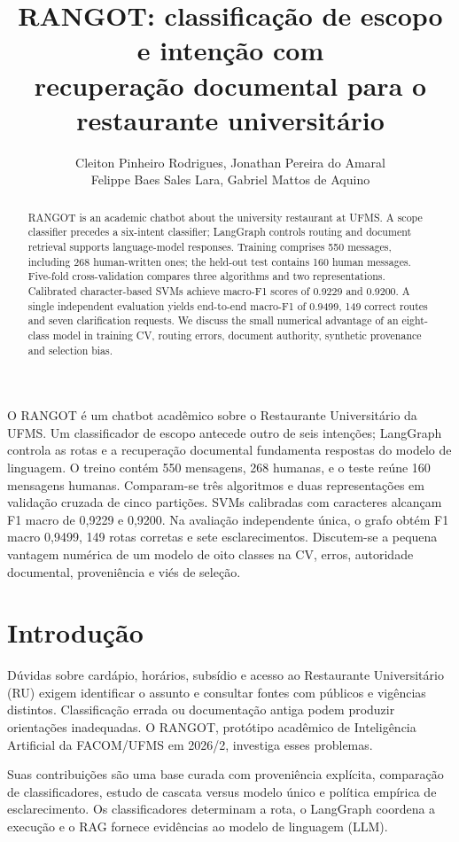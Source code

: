 \documentclass[12pt]{article}
\title{RANGOT: classificação de escopo e intenção com\\recuperação documental para o restaurante universitário}
\author{Cleiton Pinheiro Rodrigues\inst{1}, Jonathan Pereira do Amaral\inst{1}\\
Felippe Baes Sales Lara\inst{1}, Gabriel Mattos de Aquino\inst{1}}
\begin{document}
\maketitle
\begin{abstract}
RANGOT is an academic chatbot about the university restaurant at UFMS.
A scope classifier precedes a six-intent classifier; LangGraph controls routing
and document retrieval supports language-model responses. Training comprises
550 messages, including 268 human-written ones; the held-out test contains 160
human messages. Five-fold cross-validation compares three algorithms and two
representations. Calibrated character-based SVMs achieve macro-F1 scores of
0.9229 and 0.9200. A single independent evaluation yields end-to-end macro-F1
of 0.9499, 149 correct routes and seven clarification requests. We discuss
the small numerical advantage of an eight-class model in training CV,
routing errors, document authority, synthetic provenance and selection bias.
\end{abstract}
\begin{resumo}
O RANGOT é um chatbot acadêmico sobre o Restaurante Universitário da UFMS.
Um classificador de escopo antecede outro de seis intenções; LangGraph controla
as rotas e a recuperação documental fundamenta respostas do modelo de linguagem.
O treino contém 550 mensagens, 268 humanas, e o teste reúne 160 mensagens humanas.
Comparam-se três algoritmos e duas representações em validação cruzada de cinco
partições. SVMs calibradas com caracteres alcançam F1 macro de 0,9229 e 0,9200.
Na avaliação independente única, o grafo obtém F1 macro 0,9499, 149 rotas corretas
e sete esclarecimentos. Discutem-se a pequena vantagem numérica de um modelo
de oito classes na CV, erros, autoridade documental, proveniência e viés de seleção.
\end{resumo}

\section{Introdução}
Dúvidas sobre cardápio, horários, subsídio e acesso ao Restaurante Universitário
(RU) exigem identificar o assunto e consultar fontes com públicos e vigências
distintos. Classificação errada ou documentação antiga podem produzir orientações
inadequadas. O RANGOT, protótipo acadêmico de Inteligência Artificial da
FACOM/UFMS em 2026/2, investiga esses problemas.

Suas contribuições são uma base curada com proveniência explícita, comparação
de classificadores, estudo de cascata versus modelo único e política empírica de
esclarecimento. Os classificadores determinam a rota, o LangGraph coordena a
execução e o RAG fornece evidências ao modelo de linguagem (LLM).
\end{document}
